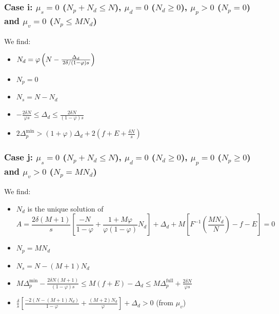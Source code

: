 \documentclass[english, a4paper]{article}
\theoremstyle{plain}
\theoremstyle{definition}
\theoremstyle{remark}
\begin{document}
    

    \subsubsection{Case i: $\mu_s = 0$ ($N_p + N_d \leq N$), $\mu_d = 0$ ($N_d \geq 0$), $\mu_p > 0$ ($N_p = 0$) and $\mu_v = 0$ ($N_p \leq MN_d$)}

    We find:

    \begin{itemize}
        \item $N_d = \varphi \left( N - \frac{\Delta_d}{\left. 2\delta \middle/ (1-\varphi)s  \right.} \right)$
        \item $N_p = 0$
        \item $N_s = N - N_d$
        \item $-\frac{2\delta N}{\varphi s} \leq \Delta_d \leq \frac{2\delta N}{(1-\varphi) s}$
        \item $2\Delta_p^{\text{min}} > (1 + \varphi)\Delta_d + 2(f + E + \frac{\delta N}{s})$
    \end{itemize}
    

    \subsubsection{Case j: $\mu_s = 0$ ($N_p + N_d \leq N$), $\mu_d = 0$ ($N_d \geq 0$), $\mu_p = 0$ ($N_p \geq 0$) and $\mu_v > 0$ ($N_p = MN_d$)}

    We find:

    \begin{itemize}
        \item $N_d$ is the unique solution of
        \begin{equation}A = \frac{2\delta (M+1)}{s} \left[ \frac{-N}{1-\varphi} + \frac{1 + M\varphi}{\varphi(1-\varphi)}N_d \right] + \Delta_d + M \left[ F^{-1}\left( \frac{MN_d}{N} \right) - f - E \right] = 0
        \label{eq_compstatcond_casej}
        \end{equation}
        \item $N_p = MN_d$
        \item $N_s = N - (M+1) N_d$
        \item $M\Delta_p^{\text{min}} -\frac{2\delta N(M+1)}{(1-\varphi)s} \leq M(f+E) - \Delta_d \leq M\Delta_p^{\text{full}} + \frac{2\delta N}{\varphi s}$
        \item $\frac{\delta}{s} \left[ \frac{-2(N - (M+1)N_d)}{1 -\varphi} + \frac{(M+2)N_d}{\varphi} \right] + \Delta_d > 0$ (from $\mu_v$)
    \end{itemize}
\end{document}
